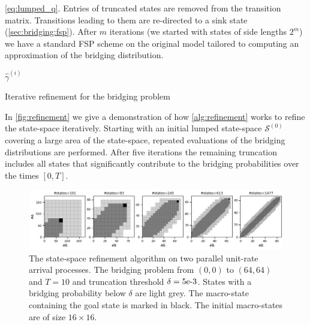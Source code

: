  \eqref{eq:lumped_q}. 
 Entries of truncated states are removed from the transition matrix. Transitions leading to them are
re-directed to a sink state (\autoref{sec:bridging:fsp}).
After $m$ iterations (we started with states of side lengths $2^m$)
we have a standard \ac{FSP} scheme
on the original model tailored to
computing an approximation of the bridging distribution.
\begin{algorithm}[htb]
\Return ${\hat\gamma}^{(i)}$\;
    \caption{Iterative refinement for the bridging problem}
    \label{alg:refinement}
\end{algorithm}

In \autoref{fig:refinement} we give a demonstration of how
\autoref{alg:refinement} works to refine the state-space
iteratively. Starting with an initial lumped state-space $\mathcal{S}^{(0)}$ covering a large area of the state-space,
repeated evaluations of the bridging distributions are performed.
After five iterations the remaining truncation includes all states
that significantly contribute to the bridging
probabilities over the times $[0,T]$.
\begin{figure}[tb]
    \centering
    \includegraphics[width=\textwidth]{gfx/refinement.png}
	\caption[State-space refinement algorithm on two parallel unit-rate arrival processes]{The state-space refinement algorithm on two parallel unit-rate arrival processes. The bridging problem from $(0,0)$ to $(64, 64)$ and $T=10$ and truncation threshold $\delta= \text{5e-3} $. States with a bridging probability below $\delta$ are light grey. The macro-state containing the goal state is marked in black. The initial macro-states are of size $16\times 16$.}
    \label{fig:refinement}
\end{figure}

